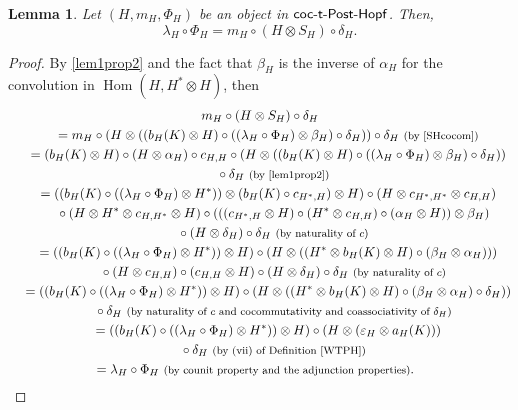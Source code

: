 \documentclass[10pt,a4paper]{amsart}
\numberwithin{equation}{section}
\newtheorem{Lemma}[Theorem]{Lemma}
 { \theoremstyle{definition}
\newtheorem{Definition}[Theorem]{Definition}
\newtheorem{Example}[Theorem]{Example}
\newtheorem{Remark}[Theorem]{Remark} }
\DeclareMathOperator{\Hom}{Hom}
\begin{document}
\begin{Lemma}
Let $(H,m_{H},\Phi_{H})$ be an object in $\sf{coc}\textnormal{-}\sf{t}\textnormal{-}\sf{Post}\textnormal{-}\sf{Hopf}$. Then,
\begin{equation}\label{relation lambdaH and SH}
\lambda_{H}\circ\Phi_{H}=m_{H}\circ (H\otimes S_{H})\circ\delta_{H}.
\end{equation}
\end{Lemma}
\begin{proof} By \eqref{lem1prop2} and the fact that $\beta_{H}$ is the inverse of $\alpha_{H}$ for the convolution in $\Hom(H,H^{\ast}\otimes H)$, then
	\begin{gather*}
 m_{H} \circ (H\otimes S_{H})\circ\delta_{H}\\
 \quad{}= m_{H}\circ (H\otimes ((b_{H}(K)\otimes H)\circ ((\lambda_{H}\circ\Phi_{H})\otimes\beta_{H})\circ\delta_{H}))\circ\delta_{H}\ \text{\footnotesize\textnormal{(by \eqref{SHcocom})}}\\
 \quad{}= (b_{H}(K)\otimes H)\circ (H\otimes\alpha_{H})\circ c_{H,H}\circ (H\otimes ((b_{H}(K)\otimes H)\circ ((\lambda_{H}\circ\Phi_{H})\otimes\beta_{H})\circ\delta_{H}))\\
 \qquad{}\circ\delta_{H}\ \text{\footnotesize\textnormal{(by \eqref{lem1prop2})}}\\
 \quad{}= ((b_{H}(K)\circ ((\lambda_{H}\circ \Phi_{H})\otimes H^{\ast}))\otimes (b_{H}(K)\circ c_{H^{\ast},H})\otimes H)\circ (H\otimes c_{H^{\ast},H^{\ast}}\otimes c_{H,H})\\
 \qquad{}\circ (H\otimes H^{\ast}\otimes c_{H,H^{\ast}}\otimes H)\circ (((c_{H^{\ast},H}\otimes H)\circ (H^{\ast}\otimes c_{H,H})\circ (\alpha_{H}\otimes H))\otimes \beta_{H})\\
 \qquad{}\circ (H\otimes\delta_{H})\circ\delta_{H}\ \text{\footnotesize\textnormal{(by naturality of $c$)}}\\
 \quad{}= ((b_{H}(K)\circ ((\lambda_{H}\circ\Phi_{H})\otimes H^{\ast}))\otimes H)\circ (H\otimes ((H^{\ast}\otimes b_{H}(K)\otimes H)\circ (\beta_{H}\otimes\alpha_{H})))\\
 \qquad{}\circ (H\otimes c_{H,H})\circ (c_{H,H}\otimes H)\circ (H\otimes\delta_{H})\circ\delta_{H}\ \text{\footnotesize\textnormal{(by naturality of $c$)}}\\
 \quad{}= ((b_{H}(K)\circ ((\lambda_{H}\circ\Phi_{H})\otimes H^{\ast}))\otimes H)\circ (H\otimes ((H^{\ast}\otimes b_{H}(K)\otimes H)\circ (\beta_{H}\otimes\alpha_{H})\circ\delta_{H}))\\
 \qquad{}\circ\delta_{H}\ \text{\footnotesize\textnormal{(by naturality of $c$ and cocommutativity and coassociativity of $\delta_{H}$)}}\\
 \quad{}= ((b_{H}(K)\circ ((\lambda_{H}\circ\Phi_{H})\otimes H^{\ast}))\otimes H)\circ (H\otimes (\varepsilon_{H}\otimes a_{H}(K)))\\
 \qquad{}\circ\delta_{H}\ \text{\footnotesize\textnormal{(by (vii) of Definition \ref{WTPH})}}\\
 \quad{}= \lambda_{H}\circ\Phi_{H}\ \text{\footnotesize\textnormal{(by counit property and the adjunction properties)}}.\tag*{\qed}
	\end{gather*}
	\renewcommand{\qed}{}
\end{proof}
\end{document}
